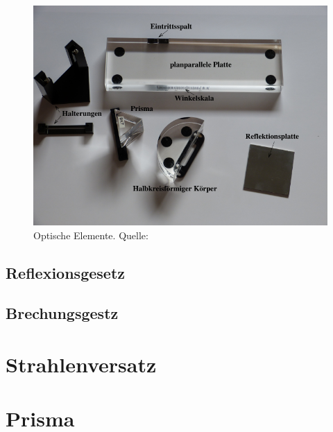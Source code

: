 \begin{figure}[H]
    \centering
    \includegraphics[scale = 0.3]{pictures/Teile.png}
    \caption{Optische Elemente. Quelle: \cite{AP01}}
    \label{fig:Teile}
\end{figure}

\subsection{Reflexionsgesetz}
\label{sec:reflexionsmessung}
\subsection{Brechungsgestz}
\label{sec:brechungmessung}
\section{Strahlenversatz}
\label{sec:strahlenversatzmessung}
\section{Prisma}
\label{sec:prismamessung}